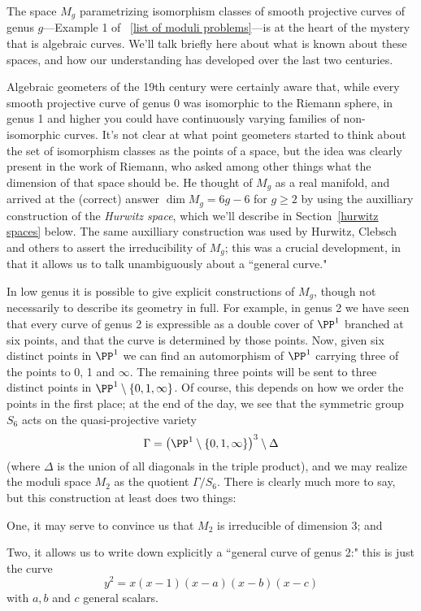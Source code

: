 The space $M_g$ parametrizing isomorphism classes of smooth projective curves of genus $g$---Example 1 of ~\ref{list of moduli problems}---is at the heart of the mystery that is algebraic curves. We'll talk briefly here about what is known about these spaces, and how our understanding has developed over the last two centuries.

Algebraic geometers of the 19th century were certainly aware that, while every smooth projective curve of genus 0 was isomorphic to the Riemann sphere, in  genus 1 and higher you could have continuously varying families of non-isomorphic curves. It's not clear at what point geometers started to think about the set of isomorphism classes as the points of a space, but the idea was clearly present in the work of Riemann, who asked among other things what the dimension of that space should be. He thought of $M_g$ as a real manifold, and arrived at the (correct) answer $\dim M_g = 6g-6$ for $g \geq 2$ by using the auxilliary construction of the \emph{Hurwitz space}, which we'll describe in Section~\ref{hurwitz spaces} below. The same auxilliary construction was used by Hurwitz, Clebsch and others to assert the irreducibility of $M_g$; this was a crucial development, in that it allows us to talk unambiguously about a ``general curve."

In low genus it is possible to give explicit constructions of $M_g$, though not necessarily to describe its geometry in full. For example, in genus 2 we have seen that every curve of genus 2 is expressible as a double cover of $\PP^1$ branched at six points, and  that the curve is determined by those points. Now, given six distinct points in $\PP^1$ we can find an automorphism of $\PP^1$ carrying three of the points to 0, 1 and $\infty$. The remaining three points will be sent to three distinct points in $\PP^1 \setminus \{0, 1, \infty \} $. Of course, this depends on how we order the points in the first place; at the end of the day, we see that the symmetric group $S_6$ acts on the quasi-projective variety
$$
\Gamma = \left( \PP^1 \setminus \{0, 1, \infty \} \right)^3 \setminus \Delta
$$
(where $\Delta$ is the union of all diagonals in the triple product), and we may realize the moduli space $M_2$ as the quotient $\Gamma/S_6$. There is clearly much more to say, but this construction at least does two things:

One, it may serve to convince us that $M_2$ is irreducible of dimension 3; and

Two, it allows us to write down explicitly a ``general curve of genus 2:" this is just the curve
$$
y^2 = x(x-1)(x-a)(x-b)(x-c)
$$
with $a, b$ and $c$ general scalars.

